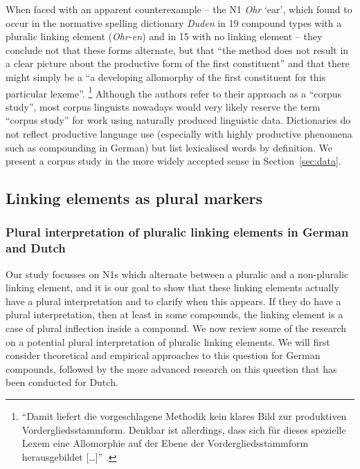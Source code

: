 When faced with an apparent counterexample -- the N1 \textit{Ohr} `ear', which \textcite[42]{NeefBorgwaldt2012} found to occur in the normative spelling dictionary \textit{Duden} \parencite{Duden2006} in 19 compound types with a pluralic linking element (\textit{Ohr-en}) and in 15 with no linking element -- they conclude not that these forms alternate, but that ``the method does not result in a clear picture about the productive form of the first constituent'' and that there might simply be a ``a developing allomorphy of the first constituent for this particular lexeme''.%
\footnote{``Damit liefert die vorgeschlagene Methodik kein klares Bild zur produktiven Vordergliedsstammform.
Denkbar ist allerdings, dass sich für dieses spezielle Lexem eine Allomorphie auf der Ebene der Vordergliedsstammform herausgebildet [\ldots]'' \parencite[31]{NeefBorgwaldt2012}.}
Although the authors refer to their approach as a ``corpus study'', most corpus linguists nowadays would very likely reserve the term ``corpus study'' for work using naturally produced linguistic data.
Dictionaries do not reflect productive language use (especially with highly productive phenomena such as compounding in German) but list lexicalised words by definition.
We present a corpus study in the more widely accepted sense in Section~\ref{sec:data}.


\subsection{Linking elements as plural markers}
\label{sec:linkagesaspluralmarkers}

\subsubsection{Plural interpretation of pluralic linking elements in German and Dutch}
\label{sec:pluralinterpretationofpluraliclinkagesingermananddutch}

Our study focusses on N1s which alternate between a pluralic and a non-pluralic linking element, and it is our goal to show that these linking elements actually have a plural interpretation and to clarify when this appears.
If they do have a plural interpretation, then at least in some compounds, the linking element is a case of plural inflection inside a compound.
We now review some of the research on a potential plural interpretation of pluralic linking elements.
We will first consider theoretical and empirical approaches to this question for German compounds, followed by the more advanced research on this question that has been conducted for Dutch.

